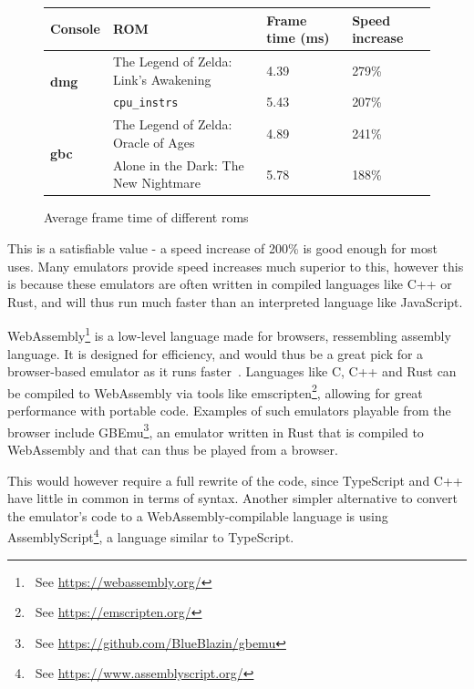 \documentclass[11pt]{informatics-report}
\newcommand{\ftnt}[1]{\footnote{~See \url{#1}}}
\begin{document}
\begin{figure}[h]
    \centering
    \begin{tabular}{|l|l|l|l|}
    \hline
    \textbf{Console} & \textbf{ROM} & \textbf{Frame time} (ms) & \textbf{Speed increase} \\ \hline

	\multirow{2}{*}{\textbf{\gls{dmg}}} 
	& The Legend of Zelda: Link's Awakening & 4.39 & 279\% \\\cline{2-4}
	& \texttt{cpu\_instrs} & 5.43 & 207\% \\\hline
	\multirow{2}{*}{\textbf{\gls{gbc}}} 
	& The Legend of Zelda: Oracle of Ages & 4.89 & 241\% \\\cline{2-4}
	& Alone in the Dark: The New Nightmare & 5.78 & 188\% \\\hline
	
    \end{tabular}
    \caption{Average frame time of different \glspl{rom}}
    \label{fig:frame-time-results}
\end{figure}

This is a satisfiable value - a speed increase of 200\% is good enough for most uses. Many emulators provide speed increases much superior to this, however this is because these emulators are often written in compiled languages like C++ or Rust, and will thus run much faster than an interpreted language like JavaScript.

WebAssembly\ftnt{https://webassembly.org/} is a low-level language made for browsers, ressembling assembly language. It is designed for efficiency, and would thus be a great pick for a browser-based emulator as it runs faster~\cite{wasm-faster}. Languages like C, C++ and Rust can be compiled to WebAssembly via tools like emscripten\ftnt{https://emscripten.org/}, allowing for great performance with portable code. Examples of such emulators playable from the browser include GBEmu\ftnt{https://github.com/BlueBlazin/gbemu}, an emulator written in Rust that is compiled to WebAssembly and that can thus be played from a browser.


This would however require a full rewrite of the code, since TypeScript and C++ have little in common in terms of syntax. Another simpler alternative to convert the emulator's code to a WebAssembly-compilable language is using AssemblyScript\ftnt{https://www.assemblyscript.org/}, a language similar to TypeScript.
\end{document}
